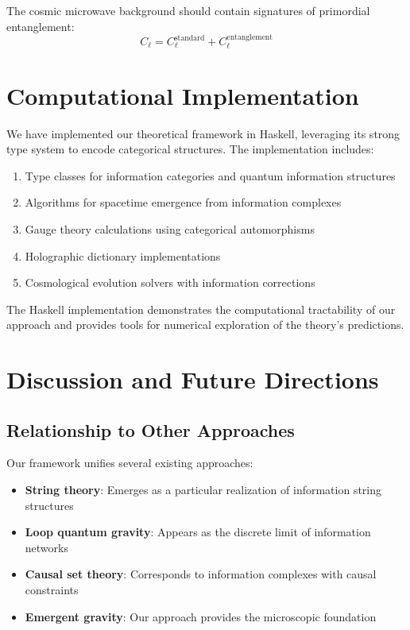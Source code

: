 \documentclass{article}
\begin{document}
The cosmic microwave background should contain signatures of primordial entanglement:
\begin{equation}
C_\ell = C_\ell^{\text{standard}} + C_\ell^{\text{entanglement}}
\end{equation}

\section{Computational Implementation}

We have implemented our theoretical framework in Haskell, leveraging its strong type system to encode categorical structures. The implementation includes:

\begin{enumerate}
\item Type classes for information categories and quantum information structures
\item Algorithms for spacetime emergence from information complexes
\item Gauge theory calculations using categorical automorphisms
\item Holographic dictionary implementations
\item Cosmological evolution solvers with information corrections
\end{enumerate}

The Haskell implementation demonstrates the computational tractability of our approach and provides tools for numerical exploration of the theory's predictions.

\section{Discussion and Future Directions}

\subsection{Relationship to Other Approaches}

Our framework unifies several existing approaches:
\begin{itemize}
\item \textbf{String theory}: Emerges as a particular realization of information string structures
\item \textbf{Loop quantum gravity}: Appears as the discrete limit of information networks
\item \textbf{Causal set theory}: Corresponds to information complexes with causal constraints
\item \textbf{Emergent gravity}: Our approach provides the microscopic foundation
\end{itemize}
\end{document}
